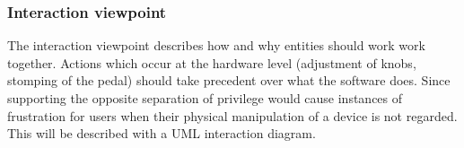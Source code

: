         
    \subsubsection{Interaction viewpoint}
        The interaction viewpoint describes how and why entities should work work together.
        Actions which occur at the hardware level (adjustment of knobs, stomping of the pedal) should take precedent over what the software does. Since supporting the opposite separation of privilege would cause instances of frustration for users when their physical manipulation of a device is not regarded.
        This will be described with a UML interaction diagram.
    
        
        
            

            
            

        
    
